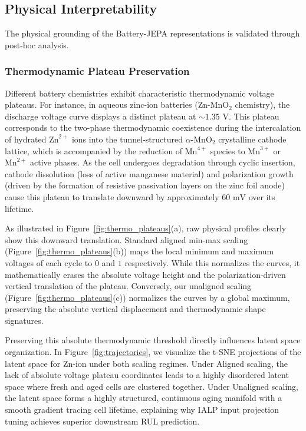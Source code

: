\documentclass[a4paper,fleqn]{cas-dc}
\begin{document}
\subsection{Physical Interpretability}
The physical grounding of the Battery-JEPA representations is validated through post-hoc analysis.

\subsubsection{Thermodynamic Plateau Preservation}
Different battery chemistries exhibit characteristic thermodynamic voltage plateaus. For instance, in aqueous zinc-ion batteries ($\text{Zn-MnO}_2$ chemistry), the discharge voltage curve displays a distinct plateau at $\sim 1.35\text{ V}$. This plateau corresponds to the two-phase thermodynamic coexistence during the intercalation of hydrated $\text{Zn}^{2+}$ ions into the tunnel-structured $\alpha\text{-MnO}_2$ crystalline cathode lattice, which is accompanied by the reduction of $\text{Mn}^{4+}$ species to $\text{Mn}^{3+}$ or $\text{Mn}^{2+}$ active phases. As the cell undergoes degradation through cyclic insertion, cathode dissolution (loss of active manganese material) and polarization growth (driven by the formation of resistive passivation layers on the zinc foil anode) cause this plateau to translate downward by approximately $60\text{ mV}$ over its lifetime.

As illustrated in Figure~\ref{fig:thermo_plateaus}(a), raw physical profiles clearly show this downward translation. Standard aligned min-max scaling (Figure~\ref{fig:thermo_plateaus}(b)) maps the local minimum and maximum voltages of each cycle to $0$ and $1$ respectively. While this normalizes the curves, it mathematically erases the absolute voltage height and the polarization-driven vertical translation of the plateau. Conversely, our unaligned scaling (Figure~\ref{fig:thermo_plateaus}(c)) normalizes the curves by a global maximum, preserving the absolute vertical displacement and thermodynamic shape signatures.

Preserving this absolute thermodynamic threshold directly influences latent space organization. In Figure~\ref{fig:trajectories}, we visualize the t-SNE projections of the latent space for Zn-ion under both scaling regimes. Under Aligned scaling, the lack of absolute voltage plateau coordinates leads to a highly disordered latent space where fresh and aged cells are clustered together. Under Unaligned scaling, the latent space forms a highly structured, continuous aging manifold with a smooth gradient tracing cell lifetime, explaining why IALP input projection tuning achieves superior downstream RUL prediction.
\end{document}
